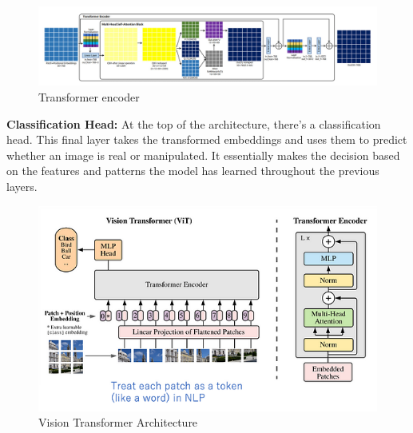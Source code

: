 \begin{figure}[h]
    \centering
    \includegraphics[width=6in]{img/encoderdetails.jpg}
    \caption{Transformer encoder}
\end{figure}
\noindent \textbf{Classification Head:} At the top of the architecture, there's a classification head. This final layer takes the transformed embeddings and uses them to predict whether an image is real or manipulated. It essentially makes the decision based on the features and patterns the model has learned throughout the previous layers.
\\

\begin{figure}[h]
    \centering
    \includegraphics[width=6in]{img/visiontransformer.png}
    \caption{Vision Transformer Architecture}
\end{figure}

\newpage






